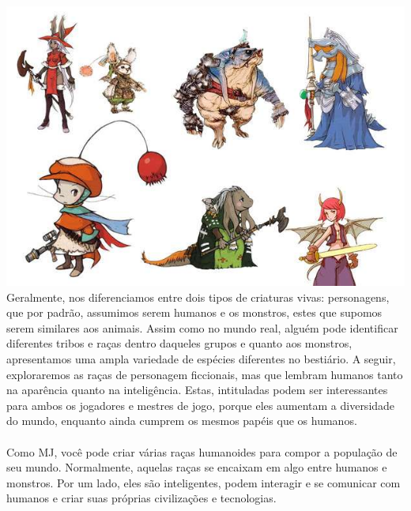 %
\\
%
\vfill
%
\includegraphics[width=\columnwidth]{./art/races/races.jpg}
%
\vfill
%
Geralmente, nos diferenciamos entre dois tipos de criaturas vivas: personagens, que por padrão, assumimos serem humanos e os monstros, estes que supomos serem similares aos animais.
Assim como no mundo real, alguém pode identificar diferentes tribos e raças dentro daqueles grupos e quanto aos monstros, apresentamos uma ampla variedade de espécies diferentes no bestiário.
A seguir, exploraremos as raças de personagem ficcionais, mas que lembram humanos tanto na aparência quanto na inteligência.
Estas, intituladas  podem ser interessantes para ambos os jogadores e mestres de jogo, porque eles aumentam a diversidade do mundo, enquanto ainda cumprem os mesmos papéis que os humanos.
%
\vfill
%
\\\\
%
Como MJ, você pode criar várias raças humanoides para compor a população de seu mundo.
Normalmente, aquelas raças se encaixam em algo entre humanos e monstros.
Por um lado, eles são inteligentes, podem interagir e se comunicar com humanos e criar suas próprias civilizações e tecnologias.
